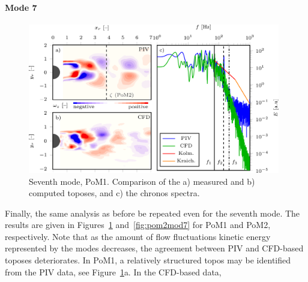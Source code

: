 {\paragraph{Mode 7}
\begin{figure}[htbp]
    \centering
    \includegraphics[width=0.98\textwidth]{02_images/00_export/figure17.png}
    \caption{{Seventh mode, PoM1.} Comparison of the a) measured and b) computed toposes, and c) the chronos spectra.}
    \label{fig:mod7}
\end{figure}
{Finally, the same analysis as before  be repeated even for the seventh mode. The results are given in Figures~\ref{fig:mod7} and~\ref{fig:pom2mod7} for PoM1 and PoM2, respectively. Note that as the amount of flow fluctuations kinetic energy represented by the modes decreases, the agreement between PIV and CFD-based toposes deteriorates. In PoM1, a relatively structured topos may be identified from the PIV data, see Figure~\ref{fig:mod7}a.  In the CFD-based data, }


}
